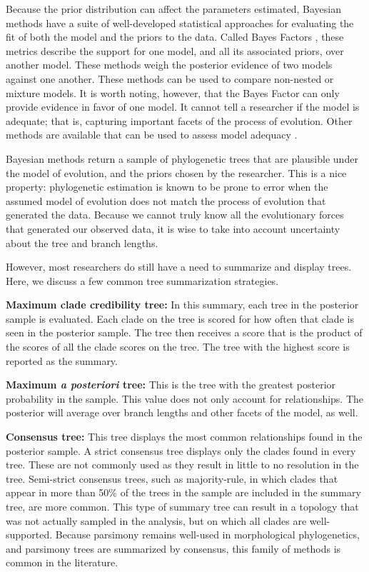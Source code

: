 \documentclass[11pt]{article}
\makeatletter
\newenvironment{boxedtext}[1]{%
  \begin{mdframed}[frametitle=#1,
    frametitlefont=\scshape\mdseries\sffamily,
    frametitlealignment=\centering,
    backgroundcolor=black!20,
    hidealllines=true,
    innerleftmargin=11\p@,innerrightmargin=11\p@,
    frametitleaboveskip=0.5\baselineskip,
    innerbottommargin=0.5\baselineskip,
    skipabove=\baselineskip,skipbelow=0.5\baselineskip]
}{%
  \end{mdframed}%
}
\makeatother
\begin{document}
Because the prior distribution can affect the parameters estimated, Bayesian methods have a suite of well-developed statistical approaches for evaluating the fit of both the model and the priors to the data.
Called Bayes Factors \cite{Xie2011}, these metrics describe the support for one model, and all its associated priors, over another model. 
These methods weigh the posterior evidence of two models against one another. 
These methods can be used to compare non-nested or mixture models.
It is worth noting, however, that the Bayes Factor can only provide evidence in favor of one model.
It cannot tell a researcher if the model is adequate; that is, capturing important facets of the process of evolution.
Other methods are available that can be used to assess model adequacy \cite{Brown2009, Brown2014}.
\clearpage

\begin{boxedtext}{Summarizing the posterior sample of trees}

Bayesian methods return a sample of phylogenetic trees that are plausible under the model of evolution, and the priors chosen by the researcher. 
This is a nice property: phylogenetic estimation is known to be prone to error when the assumed model of evolution does not match the process of evolution that generated the data.
Because we cannot truly know all the evolutionary forces that generated our observed data, it is wise to take into account uncertainty about the tree and branch lengths.

However, most researchers do still have a need to summarize and display trees. 
Here, we discuss a few common tree summarization strategies.  

\textbf{Maximum clade credibility tree:} In this summary, each tree in the posterior sample is evaluated.
Each clade on the tree is scored for how often that clade is seen in the posterior sample.
The tree then receives a score that is the product of the scores of all the clade scores on the tree.
The tree with the highest score is reported as the summary. 

\textbf{Maximum \textit{a posteriori} tree:} This is the tree with the greatest posterior probability in the sample.
This value does not only account for relationships. 
The posterior will average over branch lengths and other facets of the model, as well.

\textbf{Consensus tree:} This tree displays the most common relationships found in the posterior sample. 
A strict consensus tree displays only the clades found in every tree.
These are not commonly used as they result in little to no resolution in the tree.
Semi-strict consensus trees, such as majority-rule, in which clades that appear in more than 50\% of the trees in the sample are included in the summary tree, are more common. 
This type of summary tree can result in a topology that was not actually sampled in the analysis, but on which all clades are well-supported. 
Because parsimony remains well-used in morphological phylogenetics, and parsimony trees are summarized by consensus, this family of methods is common in the literature.



\end{boxedtext}
\end{document}
